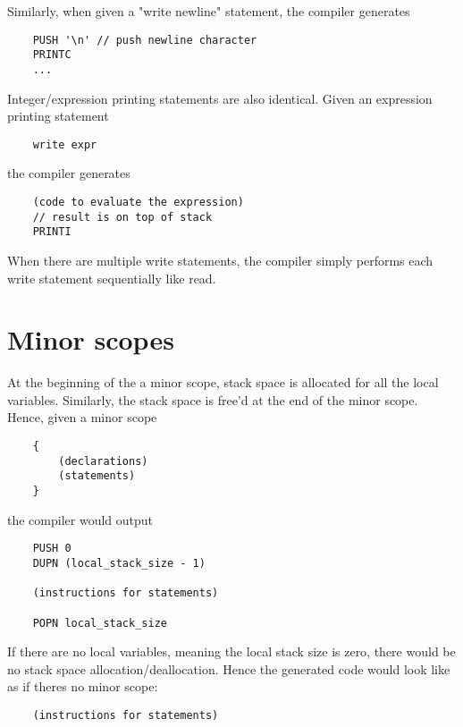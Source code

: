 \documentclass{article}
\begin{document}
\noindent
Similarly, when given a "write newline" statement, the compiler generates
\begin{lstlisting}
    PUSH '\n' // push newline character
    PRINTC
    ...
\end{lstlisting}

\noindent
Integer/expression printing statements are also identical.
\newline
Given an expression printing statement
\begin{lstlisting}
    write expr
\end{lstlisting}
the compiler generates
\begin{lstlisting}
    (code to evaluate the expression)
    // result is on top of stack
    PRINTI
\end{lstlisting}

\noindent
When there are multiple write statements, the compiler simply performs each write statement sequentially like read.

\newpage
\section{Minor scopes}

At the beginning of the a minor scope, stack space is allocated for all the local variables. Similarly, the stack space is free'd at the end of the minor scope.
\newline
\newline
Hence, given a minor scope
\begin{lstlisting}
    {
        (declarations)
        (statements)
    }
\end{lstlisting}
the compiler would output
\begin{lstlisting}
    PUSH 0
    DUPN (local_stack_size - 1)
    
    (instructions for statements)
    
    POPN local_stack_size
\end{lstlisting}

\noindent
If there are no local variables, meaning the local stack size is zero, there would be no stack space allocation/deallocation. Hence the generated code would look like as if theres no minor scope:
\begin{lstlisting}
    (instructions for statements)
\end{lstlisting}
\end{document}
